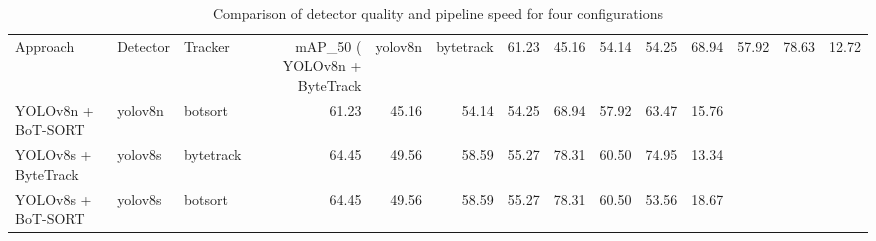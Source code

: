 \begin{table}
\caption{Comparison of detector quality and pipeline speed for four configurations}
\label{tab:models_comparison_dev}
\begin{tabular}{lllrrrrrrrr}
\toprule
Approach & Detector & Tracker & mAP_50 (%
\midrule
YOLOv8n + ByteTrack & yolov8n & bytetrack & 61.23 & 45.16 & 54.14 & 54.25 & 68.94 & 57.92 & 78.63 & 12.72 \\
YOLOv8n + BoT-SORT & yolov8n & botsort & 61.23 & 45.16 & 54.14 & 54.25 & 68.94 & 57.92 & 63.47 & 15.76 \\
YOLOv8s + ByteTrack & yolov8s & bytetrack & 64.45 & 49.56 & 58.59 & 55.27 & 78.31 & 60.50 & 74.95 & 13.34 \\
YOLOv8s + BoT-SORT & yolov8s & botsort & 64.45 & 49.56 & 58.59 & 55.27 & 78.31 & 60.50 & 53.56 & 18.67 \\
\bottomrule
\end{tabular}
\end{table}
